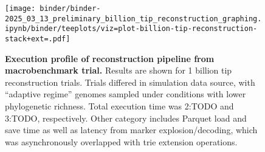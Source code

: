 \begin{center}
\begin{figure}[h]

\texttt{[image: binder/binder-2025\_03\_13\_preliminary\_billion\_tip\_reconstruction\_graphing.ipynb/binder/teeplots/viz=plot-billion-tip-reconstruction-stack+ext=.pdf]}

\caption{%
\textbf{Execution profile of reconstruction pipeline from macrobenchmark trial.}
\small
Results are shown for 1 billion tip reconstruction trials.
Trials differed in simulation data source, with ``adaptive regime'' genomes sampled under conditions with lower phylogenetic richness.
Total execution time was 2:TODO and 3:TODO, respectively.
Other category includes Parquet load and save time as well as latency from marker explosion/decoding, which was asynchronously overlapped with trie extension operations.
}
\label{fig:billion-tip-time}
\end{figure}
\end{center}
